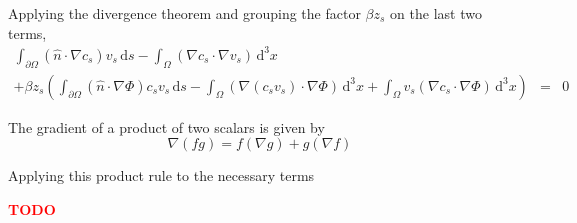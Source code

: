Applying the divergence theorem and grouping the factor $\beta z_s$ on the last two terms,
\begin{equation}
\begin{aligned}
\int_{\partial\Omega} \left( \hat{n} \cdot \nabla c_s \right) v_s \,\mathrm{d}s
- \int_\Omega \left( \nabla c_s \cdot \nabla v_s \right) \,\mathrm{d}^3x \\
+ \beta z_s \left( \int_{\partial\Omega} \left( \hat{n} \cdot \nabla \Phi \right) c_s v_s \,\mathrm{d}s
- \int_\Omega \left( \nabla \left( c_s v_s \right)  \cdot \nabla \Phi \right) \,\mathrm{d}^3x
+ \int_\Omega  v_s \left( \nabla c_s \cdot \nabla \Phi \right) \,\mathrm{d}^3x \right)
& = & 0
\end{aligned}
\end{equation}

The gradient of a product of two scalars is given by
\begin{equation}
\nabla(fg) = f(\nabla g) + g (\nabla f)
\end{equation}

Applying this product rule to the necessary terms


\textcolor{red}{\textbf{TODO}}
